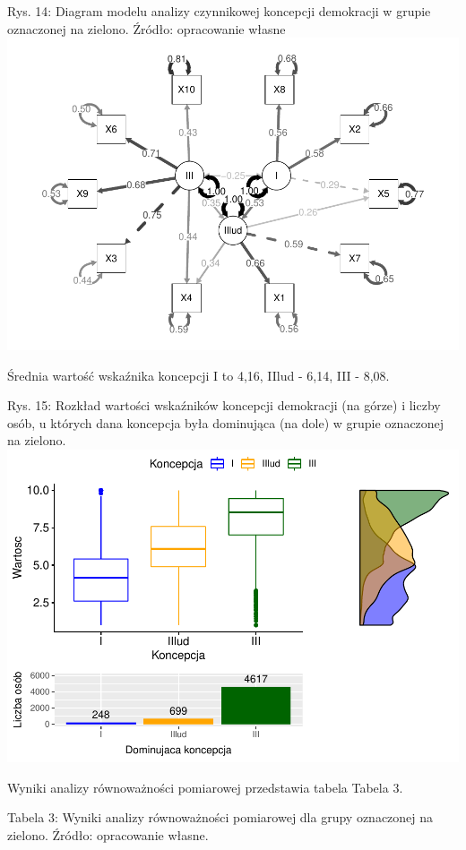 \documentclass[12pt]{article}
\begin{document}
Rys. 14: Diagram modelu analizy czynnikowej koncepcji demokracji w grupie oznaczonej na zielono. Źródło: opracowanie własne
\includegraphics{text_ASA_files/figure-latex/diagram-1-1.pdf}

Średnia wartość wskaźnika koncepcji I to 4,16, IIlud - 6,14, III - 8,08.

Rys. 15: Rozkład wartości wskaźników koncepcji demokracji (na górze) i liczby osób, u których dana koncepcja była dominująca (na dole) w grupie oznaczonej na zielono.
\includegraphics{text_ASA_files/figure-latex/stats-gr-1-1.pdf}

Wyniki analizy równoważności pomiarowej przedstawia tabela Tabela 3.

Tabela 3: Wyniki analizy równoważności pomiarowej dla grupy oznaczonej na zielono. Źródło: opracowanie własne.
\end{document}
